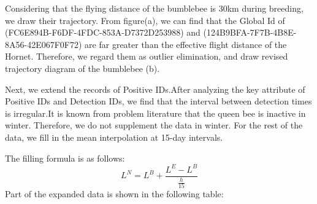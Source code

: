 \documentclass{mcmthesis}
\begin{document}
Considering that the flying distance of the bumblebee is 30km during breeding, we draw their trajectory. From figure(a), we can find that the Global Id of (FC6E894B-F6DF-4FDC-853A-D7372D253988) and (124B9BFA-7F7B-4B8E-8A56-42E067F0F72) are far greater than the effective flight distance of the Hornet. Therefore, we regard them as outlier elimination, and draw revised trajectory diagram of the bumblebee (b).

\begin{figure}[H]
	\centering
\end{figure}

Next, we extend the records of Positive IDs.After analyzing the key attribute of Positive IDs and Detection IDs, we find that the interval between detection times is irregular.It is known from  problem literature that the queen bee is inactive in winter. Therefore, we do not supplement the data in winter. For the rest of the data, we fill in the mean interpolation at 15-day intervals. 

The filling formula is as follows:
\begin{equation}
	L^N=L^B+\frac{L^E-L^B}{\frac{h}{15}}
\end{equation}
Part of the expanded data is shown in the following table:
\end{document}
